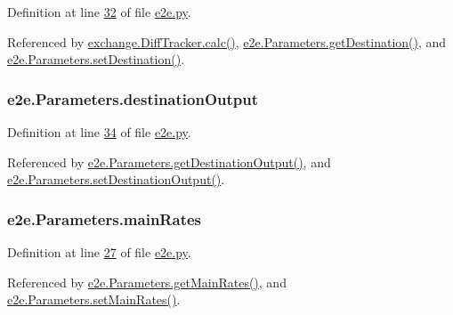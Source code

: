 Definition at line \hyperlink{e2e_8py_source_l00032}{32} of file \hyperlink{e2e_8py_source}{e2e.\+py}.



Referenced by \hyperlink{exchange_8py_source_l00272}{exchange.\+Diff\+Tracker.\+calc()}, \hyperlink{e2e_8py_source_l00084}{e2e.\+Parameters.\+get\+Destination()}, and \hyperlink{e2e_8py_source_l00081}{e2e.\+Parameters.\+set\+Destination()}.

\subsubsection[{\texorpdfstring{destination\+Output}{destinationOutput}}]{\setlength{\rightskip}{0pt plus 5cm}e2e.\+Parameters.\+destination\+Output}\hypertarget{classe2e_1_1_parameters_a3b4ae5aa9b73466e51018b6f37792577}{}\label{classe2e_1_1_parameters_a3b4ae5aa9b73466e51018b6f37792577}


Definition at line \hyperlink{e2e_8py_source_l00034}{34} of file \hyperlink{e2e_8py_source}{e2e.\+py}.



Referenced by \hyperlink{e2e_8py_source_l00096}{e2e.\+Parameters.\+get\+Destination\+Output()}, and \hyperlink{e2e_8py_source_l00093}{e2e.\+Parameters.\+set\+Destination\+Output()}.

\subsubsection[{\texorpdfstring{main\+Rates}{mainRates}}]{\setlength{\rightskip}{0pt plus 5cm}e2e.\+Parameters.\+main\+Rates}\hypertarget{classe2e_1_1_parameters_aaa2b41d7017ab4893bbe27fa8edb7180}{}\label{classe2e_1_1_parameters_aaa2b41d7017ab4893bbe27fa8edb7180}


Definition at line \hyperlink{e2e_8py_source_l00027}{27} of file \hyperlink{e2e_8py_source}{e2e.\+py}.



Referenced by \hyperlink{e2e_8py_source_l00054}{e2e.\+Parameters.\+get\+Main\+Rates()}, and \hyperlink{e2e_8py_source_l00051}{e2e.\+Parameters.\+set\+Main\+Rates()}.

